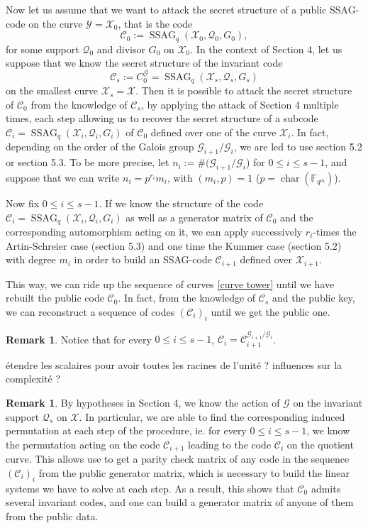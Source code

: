 \documentclass[10pt]{article}
\theoremstyle{definition}
\theoremstyle{definition}
\newtheorem{rq1}[thm]{Remark}
\theoremstyle{definition}
\newcommand{\s}{\vspace{0.3cm}}
\newcommand{\C}{\mathcal{C}}
\newcommand{\fqm}{\mathbb{F}_{q^m}}
\newcommand{\X}{\mathcal{X}}
\newcommand{\Y}{\mathcal{Y}}
\newcommand{\QR}{\mathcal{Q}}
\newcommand{\G}{\mathcal{G}}
\newcommand{\ssag}{\operatorname{SSAG}}
\begin{document}
Now let us assume that we want to attack the secret structure of a public SSAG-code on the curve $\Y=\X_0$, that is the code 
\[\C_0 := \ssag_q(\X_0,\QR_0,G_0),\]
for some support $\QR_0$ and divisor $G_0$ on $\X_0$. In the context of Section 4, let us suppose that we know the secret structure of the invariant code 
\[\C_s:= C_0^{\G} = \ssag_q(\X_s,\QR_s,G_s)\]
on the smallest curve $\X_s=\X$. Then it is possible to attack the secret structure of $\C_0$ from the knowledge of $\C_s$, by applying the attack of Section 4 multiple times, each step allowing us to recover the secret structure of a subcode $\C_i=\ssag_q(\X_i,\QR_i,G_i)$ of $\C_0$ defined over one of the curve $\X_i$. In fact, depending on the order of the Galois group $\G_{i+1}/\G_i$, we are led to use section 5.2 or section 5.3. 
To be more precise, let $n_i:= \#(\G_{i+1}/\G_i$) for $0 \leq i \leq s-1$, and suppose that we can write $n_i = p^{r_i}m_i$, with $(m_i,p)=1$ ($p=\operatorname{char}(\fqm)$). 
\s

Now fix $0 \leq i \leq s-1$. If we know the structure of the code $\C_i = \ssag_q(\X_i,\QR_i,G_i)$ as well as a generator matrix of $\C_0$ and the corresponding automorphism acting on it, we can apply successively $r_i$-times the Artin-Schreier case (section 5.3) and one time the Kummer case (section 5.2) with degree $m_i$ in order to build an SSAG-code $\C_{i+1}$ defined over $\X_{i+1}$. 

This way, we can ride up the sequence of curves \eqref{curve tower} until we have rebuilt the public code $\C_0$. In fact, from the knowledge of $\C_s$ and the public key, we can reconstruct a sequence of codes $(\C_i)_i$ until we get the public one. 

\s

\begin{rq1}
Notice that for every $0 \leq i \leq s-1$, $\C_i = \C_{i+1}^{\G_{i+1}/\G_i}$. 
\end{rq1}

\color{red} étendre les scalaires pour avoir toutes les racines de l'unité ? influences sur la complexité ? \color{black}

\begin{rq1} \label{induced permutation} By hypotheses in Section 4, we know the action of $\G$ on the invariant support $\QR_s$ on $\X$. In particular, we are able to find the corresponding induced permutation at each step of the procedure, ie. for every $0 \leq i \leq s-1$, we know the permutation acting on the code $\C_{i+1}$ leading to the code $\C_i$ on the quotient curve. This allows use to get a parity check matrix of any code in the sequence $(\C_i)_i$ from the public generator matrix, which is necessary to build the linear systems we have to solve at each step. As a result, this shows that $\C_0$ admits several invariant codes, and one can build a generator matrix of anyone of them from the public data.
\end{rq1}
\end{document}
